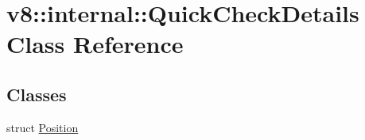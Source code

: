 \hypertarget{classv8_1_1internal_1_1QuickCheckDetails}{}\section{v8\+:\+:internal\+:\+:Quick\+Check\+Details Class Reference}
\label{classv8_1_1internal_1_1QuickCheckDetails}
\subsection*{Classes}
\begin{DoxyCompactItemize}
\item 
struct \mbox{\hyperlink{structv8_1_1internal_1_1QuickCheckDetails_1_1Position}{Position}}
\end{DoxyCompactItemize}
